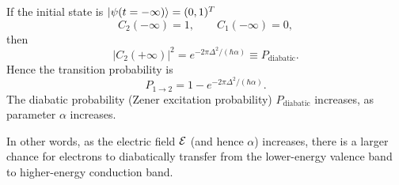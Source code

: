 If the initial state is $|{\psi(t=-\infty)}\rangle=(0,1)^T$
\begin{equation}
C_2(-\infty)=1,
\qquad
C_1(-\infty)=0,
\end{equation}
then
\begin{equation}
|C_2(+\infty)|^2
=e^{-2\pi\Delta^2/(\hbar\alpha)}\equiv P_\text{diabatic}.
\end{equation}
Hence the transition probability is
\begin{equation}
\boxed{
P_{1\to2}=1-e^{-2\pi\Delta^2/(\hbar\alpha)}.}
\end{equation}
The diabatic probability (Zener excitation probability) $P_\text{diabatic}$ increases, as parameter $\alpha$ increases. 

In other words, as the electric field $\mathcal{E}$ (and hence $\alpha$) increases, there is a larger chance for electrons to diabatically transfer from the lower-energy valence band to higher-energy conduction band. 



